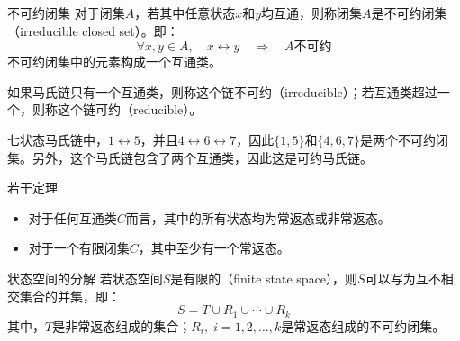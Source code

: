 \documentclass[t]{beamer}
\begin{document}
\begin{frame}{不可约闭集}
    对于闭集$A$，若其中任意状态$x$和$y$均互通，则称闭集$A$是不可约闭集（irreducible closed set）。即：
    \[\forall x,y\in A,\quad x\leftrightarrow y \quad \Rightarrow\quad \text{$A$不可约}\]
    不可约闭集中的元素构成一个互通类。

    如果马氏链只有一个互通类，则称这个链不可约（irreducible）；若互通类超过一个，则称这个链可约（reducible）。

    \begin{block}{}
        七状态马氏链中，$1\leftrightarrow 5$，并且$4\leftrightarrow 6\leftrightarrow 7$，因此$\{1,5\}$和$\{4,6,7\}$是两个不可约闭集。另外，这个马氏链包含了两个互通类，因此这是可约马氏链。
    \end{block}
\end{frame}

\begin{frame}{若干定理}
\begin{itemize}
    \item 对于任何互通类$C$而言，其中的所有状态均为常返态或非常返态。
    \item 对于一个有限闭集$C$，其中至少有一个常返态。
\end{itemize}
\end{frame}



\begin{frame}{状态空间的分解}
    若状态空间$S$是有限的（finite state space），则$S$可以写为互不相交集合的并集，即：
	\[S=T\cup R_1\cup \cdots \cup R_k \]
	其中，$T$是非常返态组成的集合；$R_i,\; i=1,2,\ldots,k$是常返态组成的不可约闭集。
\end{frame}
\end{document}
